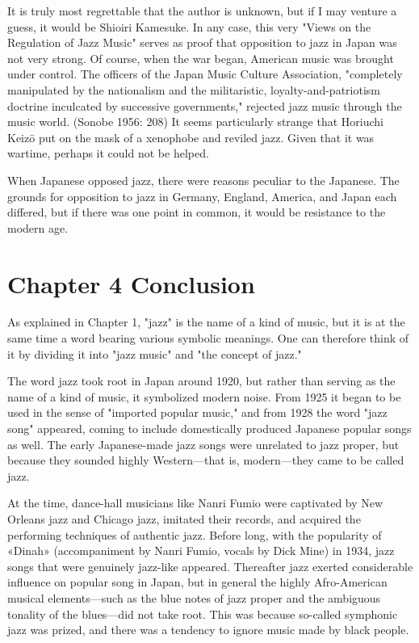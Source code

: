 It is truly most regrettable that the author is unknown, but if I may venture a guess, it would be Shioiri Kamesuke. In any case, this very "Views on the Regulation of Jazz Music" serves as proof that opposition to jazz in Japan was not very strong. Of course, when the war began, American music was brought under control. The officers of the Japan Music Culture Association, "completely manipulated by the nationalism and the militaristic, loyalty-and-patriotism doctrine inculcated by successive governments," rejected jazz music through the music world. (Sonobe 1956: 208) It seems particularly strange that Horiuchi Keizō put on the mask of a xenophobe and reviled jazz. Given that it was wartime, perhaps it could not be helped.

When Japanese opposed jazz, there were reasons peculiar to the Japanese. The grounds for opposition to jazz in Germany, England, America, and Japan each differed, but if there was one point in common, it would be resistance to the modern age.

\section{Chapter 4  Conclusion}

As explained in Chapter 1, "jazz" is the name of a kind of music, but it is at the same time a word bearing various symbolic meanings. One can therefore think of it by dividing it into "jazz music" and "the concept of jazz."

The word jazz took root in Japan around 1920, but rather than serving as the name of a kind of music, it symbolized modern noise. From 1925 it began to be used in the sense of "imported popular music," and from 1928 the word "jazz song" appeared, coming to include domestically produced Japanese popular songs as well. The early Japanese-made jazz songs were unrelated to jazz proper, but because they sounded highly Western—that is, modern—they came to be called jazz.

At the time, dance-hall musicians like Nanri Fumio were captivated by New Orleans jazz and Chicago jazz, imitated their records, and acquired the performing techniques of authentic jazz. Before long, with the popularity of «Dinah» (accompaniment by Nanri Fumio, vocals by Dick Mine) in 1934, jazz songs that were genuinely jazz-like appeared. Thereafter jazz exerted considerable influence on popular song in Japan, but in general the highly Afro-American musical elements—such as the blue notes of jazz proper and the ambiguous tonality of the blues—did not take root. This was because so-called symphonic jazz was prized, and there was a tendency to ignore music made by black people.

